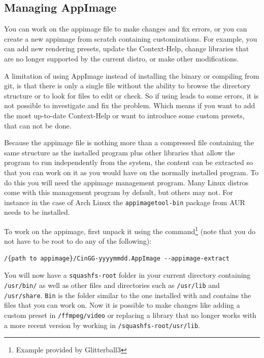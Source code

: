 \subsection{Managing AppImage}
\label{sub:managing_appimage}

You can work on the appimage file to make changes and fix errors, or you can create a new appimage from scratch containing customizations. For example, you can add new rendering presets, update the Context-Help, change libraries that are no longer supported by the current distro, or make other modifications.

A limitation of using AppImage instead of installing the binary or compiling from git, is that there is only a single file without the ability to browse the directory structure or to look for files to edit or check. So if using \CGG{} leads to some errors, it is not possible to investigate and fix the problem. Which means if you want to add the most up-to-date Context-Help or want to introduce some custom presets, that can not be done.

Because the appimage file is nothing more than a compressed file containing the same structure as the installed program plus other libraries that allow the program to run independently from the system, the content can be extracted so that you can work on it as you would have on the normally installed program.  To do this you will need the appimage management program.
Many Linux distros come with this management program by default, but others may not. For instance in the case of Arch Linux the \texttt{appimagetool-bin} package from AUR needs to be installed. 

To work on the appimage, first unpack it using the command\protect\footnote{Example provided by Glitterball3} (note that you do not have to be root to do any of the following):

\begin{lstlisting}[numbers=none]
	/{path to appimage}/CinGG-yyyymmdd.AppImage --appimage-extract
\end{lstlisting}

You will now have a \texttt{squashfs-root} folder in your current directory containing \texttt{/usr/bin/} as well as other files and directories such as \texttt{/usr/lib} and \texttt{/usr/share}. \texttt{Bin} is the folder similar to the one installed with \CGG{} and contains the files that you can work on. Now it is possible to make changes like adding a custom preset in \texttt{/ffmpeg/video} or replacing a library that no longer works with a more recent version by working in \texttt{/squashfs-root/usr/lib}.


